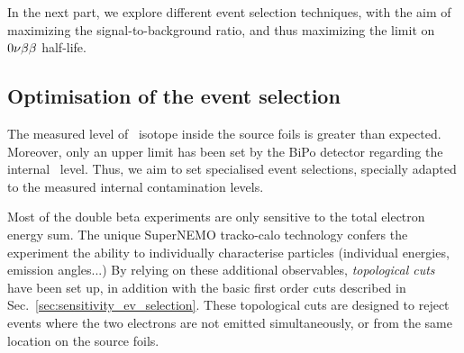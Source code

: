 In the next part, we explore different event selection techniques, with the aim of maximizing the signal-to-background ratio, and thus maximizing the limit on $0\nu\beta\beta$ half-life.

\subsection{Optimisation of the event selection}
\label{sec:opti_ev_selection}

The measured level of \Tl\ isotope inside the source foils is greater than expected.
Moreover, only an upper limit has been set by the BiPo detector regarding the internal \Bi\ level.
Thus, we aim to set specialised event selections, specially adapted to the measured internal contamination levels.

Most of the double beta experiments are only sensitive to the total electron energy sum.
The unique SuperNEMO tracko-calo technology confers the experiment the ability to individually characterise particles (individual energies, emission angles...)
By relying on these additional observables, \emph{topological cuts} have been set up, in addition with the basic first order cuts described in Sec.~\ref{sec:sensitivity_ev_selection}.
These topological cuts are designed to reject events where the two electrons are not emitted simultaneously, or from the same location on the source foils.

